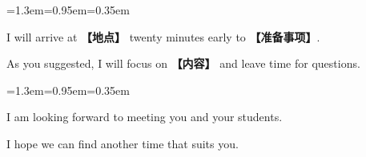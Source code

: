\documentclass[10pt,a4paper]{ctexart}
\begin{document}
\par\vspace{1pt}
\begin{list}{}{\leftmargin=1.3em=0.95em=0.35em\itemindent=0pt\topsep=0pt\partopsep=0pt\parsep=1.5pt\itemsep=0pt}
\item[{\color{accent}\scriptsize$\blacktriangleright$}]{\footnotesize I will arrive at {\color{accent}\bfseries 【地点】} twenty minutes early to {\color{accent}\bfseries 【准备事项】}.}\par{}
\item[{\color{accent}\scriptsize$\blacktriangleright$}]{\footnotesize As you suggested, I will focus on {\color{accent}\bfseries 【内容】} and leave time for questions.}\par{}
\end{list}
\par\vspace{1pt}
\begin{list}{}{\leftmargin=1.3em=0.95em=0.35em\itemindent=0pt\topsep=0pt\partopsep=0pt\parsep=1.5pt\itemsep=0pt}
\item[{\color{accent}\scriptsize$\blacktriangleright$}]{\footnotesize I am looking forward to meeting you and your students.}\par{}
\item[{\color{accent}\scriptsize$\blacktriangleright$}]{\footnotesize I hope we can find another time that suits you.}\par{}
\end{list}
\par
\endgroup
\vspace{4pt}\par\nopagebreak
\end{document}
